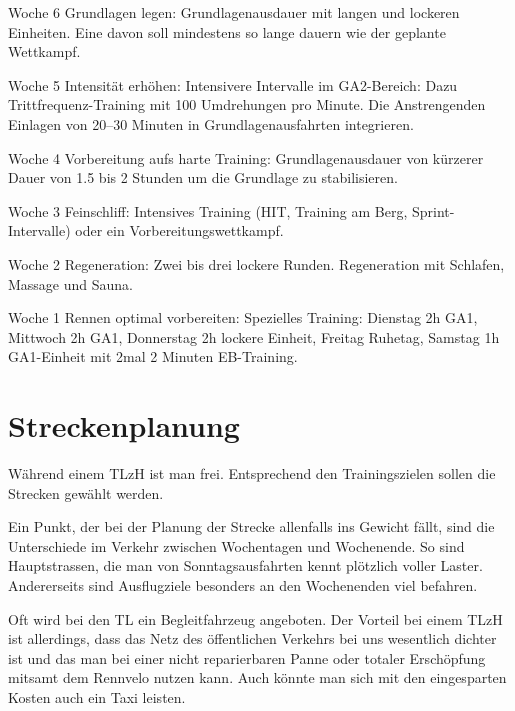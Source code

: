 \documentclass[a4paper,DIV13,BCOR0cm]{scrartcl}
\newcommand{\rv}{Rennvelo}
\newcommand{\tlzh}{TLzH}
\begin{document}
\begin{itemize*}
        \item Woche 6 Grundlagen legen:
                Grundlagenausdauer mit langen und lockeren Einheiten.
                Eine davon soll mindestens so lange dauern wie der geplante Wettkampf.
        \item Woche 5 Intensität erhöhen:
                Intensivere Intervalle im GA2-Bereich:
                Dazu Trittfrequenz-Training mit 100 Umdrehungen pro Minute.
                Die Anstrengenden Einlagen von 20--30 Minuten in Grundlagenausfahrten integrieren.
        \item Woche 4 Vorbereitung aufs harte Training:
                Grundlagenausdauer von kürzerer Dauer von 1.5 bis 2 Stunden
                um die Grundlage zu stabilisieren.
        \item Woche 3 Feinschliff:
                Intensives Training (HIT, Training am Berg, Sprint-Intervalle) oder ein Vorbereitungswettkampf.
        \item Woche 2 Regeneration:
                Zwei bis drei lockere Runden. Regeneration mit Schlafen, Massage und Sauna.
        \item Woche 1 Rennen optimal vorbereiten:
                Spezielles Training: Dienstag 2h GA1, Mittwoch 2h GA1, Donnerstag 2h lockere Einheit, Freitag Ruhetag, 
                Samstag 1h GA1-Einheit mit 2mal 2 Minuten EB-Training.

\end{itemize*}


\section{Streckenplanung}

Während einem \tlzh{} ist man frei. Entsprechend den Trainingszielen sollen die Strecken gewählt werden.

Ein Punkt, der bei der Planung der Strecke allenfalls ins Gewicht fällt,
sind die Unterschiede im Verkehr zwischen Wochentagen und Wochenende.
So sind Hauptstrassen, die man von Sonntagsausfahrten kennt plötzlich voller Laster.
Andererseits sind Ausflugziele besonders an den Wochenenden viel befahren.

Oft wird bei den TL ein Begleitfahrzeug angeboten.
Der Vorteil bei einem \tlzh{} ist allerdings, dass das Netz des öffentlichen Verkehrs bei uns
wesentlich dichter ist und das man bei einer nicht reparierbaren Panne oder totaler Erschöpfung
mitsamt dem \rv{} nutzen kann. Auch könnte man sich mit den eingesparten Kosten auch ein Taxi leisten.
\end{document}
